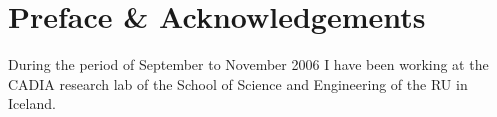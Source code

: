 \chapter*{Preface \& Acknowledgements}

During the period of September to November 2006 I have been working at the
\ac{CADIA} research lab of the School of Science and Engineering of the \ac{RU}
in Iceland.

